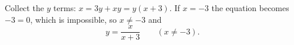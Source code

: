Collect the \(y\) terms: \(x=3y+xy=y(x+3)\). If \(x=-3\) the equation becomes \(-3=0\), which is impossible, so \(x\ne -3\) and
\[
\boxed{y=\dfrac{x}{x+3}}\qquad(x\ne -3).
\]
